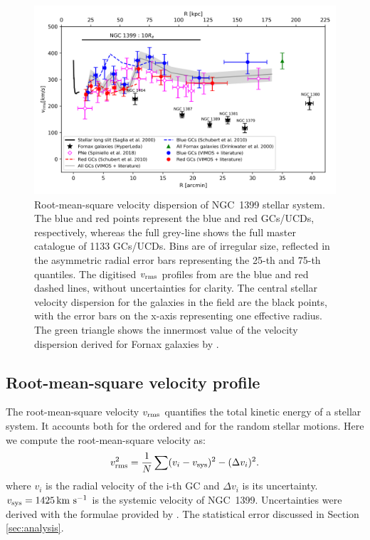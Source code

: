 \documentclass[useAMS,usenatbib]{mn2e}
\newcommand{\kms}{\mbox{\,km~s$^{-1}$}}
\begin{document}
\begin{figure}
\centering
\includegraphics[scale = 0.8]{figures/vrms_pne.png} 
\caption{Root-mean-square velocity dispersion of NGC~1399 stellar system. The 
blue and red points represent the blue and red GCs/UCDs, respectively, whereas 
the full grey-line shows the full master catalogue of 1133 GCs/UCDs. Bins are 
of irregular size, reflected in the asymmetric radial error bars representing 
the 25-th and 75-th quantiles. The digitised $v_{\rm rms}$ profiles from 
\citet{Schuberth} are the blue and red dashed lines, without uncertainties for 
clarity. The central stellar velocity dispersion for the galaxies in the field 
are the black points, with the error bars on the x-axis representing one 
effective radius. The green triangle shows the innermost value of the velocity 
dispersion derived for Fornax galaxies by \citet{Drinkwater00}.}
\label{fig:vrms}
\end{figure}

\subsection{Root-mean-square velocity profile}
The root-mean-square velocity $v_{\rm rms}$ quantifies the total kinetic energy 
of a stellar system. It accounts both for the ordered and for the random 
stellar motions. Here we compute the root-mean-square velocity as:
\begin{equation}
v_{\rm rms}^2 = \frac{1}{N}  \sum (v_i - v_{\rm sys})^2 - (\Delta v_i)^2 .
\label{eq:sigma}
\end{equation}
where $v_i$ is the radial velocity of the i-th GC and $\Delta v_i$ is its 
uncertainty. $v_{\rm sys}=1425 \kms$ is the systemic velocity of NGC~1399. 
Uncertainties were derived with the formulae provided by \citet{Danese}. 
The statistical error discussed in Section \ref{sec:analysis}.
\end{document}
